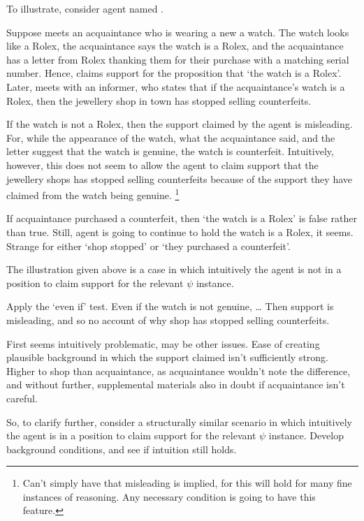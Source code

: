 \begin{note}[\nI{} example]
  To illustrate, consider agent named .

  Suppose  meets an acquaintance who is wearing a new a watch.
  The watch looks like a Rolex, the acquaintance says the watch is a Rolex, and the acquaintance has a letter from Rolex thanking them for their purchase with a matching serial number.
  Hence,  claims support for the proposition that `the watch is a Rolex'.
  Later,  meets with an informer, who states that if the acquaintance's watch is a Rolex, then the jewellery shop in town has stopped selling counterfeits.

  If the watch is not a Rolex, then the support claimed by the agent is misleading.
  For, while the appearance of the watch, what the acquaintance said, and the letter suggest that the watch is genuine, the watch is counterfeit.
  Intuitively, however, this does not seem to allow the agent to claim support that the jewellery shops has stopped selling counterfeits because of the support they have claimed from the watch being genuine.\nolinebreak
  \footnote{
    Can't simply have that misleading is implied, for this will hold for many fine instances of reasoning.
    Any necessary condition is going to have this feature.
  }
\end{note}

\begin{note}
  If acquaintance purchased a counterfeit, then `the watch is a Rolex' is false rather than true.
  Still, agent is going to continue to hold the watch is a Rolex, it seems.
  Strange for either `shop stopped' or `they purchased a counterfeit'.

  The illustration given above is a case in which intuitively the agent is not in a position to claim support for the relevant \(\psi\) instance.

  Apply the `even if' test.
  Even if the watch is not genuine, \dots
  Then support is misleading, and so no account of why shop has stopped selling counterfeits.
\end{note}

\begin{note}
  First seems intuitively problematic, may be other issues.
  Ease of creating plausible background in which the support claimed isn't sufficiently strong.
  Higher to shop than acquaintance, as acquaintance wouldn't note the difference, and without further, supplemental materials also in doubt if acquaintance isn't careful.

  So, to clarify further, consider a structurally similar scenario in which intuitively the agent is in a position to claim support for the relevant \(\psi\) instance.
  Develop background conditions, and see if intuition still holds.
\end{note}

